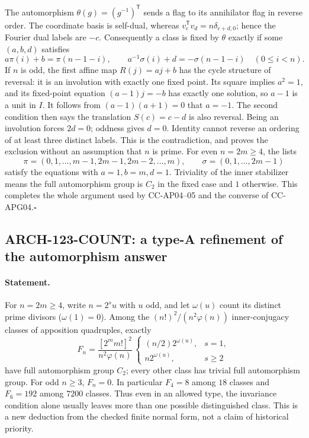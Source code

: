 The automorphism $\theta(g)=(g^{-1})^{\mathsf T}$ sends a flag to
its annihilator flag in reverse order.  The coordinate basis is
self-dual, whereas $v_c^{\mathsf T}v_d=n\delta_{c+d,0}$; hence the
Fourier dual labels are $-c$.  Consequently a class is fixed by
$\theta$ exactly if some $(a,b,d)$ satisfies
\[
 a\pi(i)+b=\pi(n-1-i),\qquad
 a^{-1}\sigma(i)+d=-\sigma(n-1-i) \quad(0\leq i<n).
\]
If $n$ is odd, the first affine map $R(j)=aj+b$ has the cycle
structure of reversal: it is an involution with exactly one fixed
point.  Its square implies $a^2=1$, and its fixed-point equation
$(a-1)j=-b$ has exactly one solution, so $a-1$ is a unit in $I$.
It follows from $(a-1)(a+1)=0$ that $a=-1$.  The second condition
then says the translation $S(c)=c-d$ is also reversal.  Being an
involution forces $2d=0$; oddness gives $d=0$.  Identity cannot
reverse an ordering of at least three distinct labels.  This is the
contradiction, and proves the exclusion without an assumption that
$n$ is prime.  For even $n=2m\geq4$, the lists
\[
 \pi=(0,1,\ldots,m-1,2m-1,2m-2,\ldots,m),\qquad
 \sigma=(0,1,\ldots,2m-1)
\]
satisfy the equations with $a=1,b=m,d=1$.  Triviality of the inner
stabilizer means the full automorphism group is $C_2$ in the fixed
case and $1$ otherwise.  This completes the whole argument used by
CC-AP04--05 and the converse of CC-APG04.\hfill$\square$

\subsection{ARCH-123-COUNT: a type-A refinement of the automorphism answer}
\paragraph{Statement.}
For $n=2m\geq4$, write $n=2^s u$ with $u$ odd, and let $\omega(u)$
count its distinct prime divisors ($\omega(1)=0$).  Among the
$(n!)^2/(n^2\varphi(n))$ inner-conjugacy classes of apposition
quadruples, exactly
\[
 F_n=\frac{[2^m m!]^2}{n^2\varphi(n)}\,
 \begin{cases}
 (n/2)2^{\omega(u)},&s=1,\\
 n2^{\omega(u)},&s\geq2
 \end{cases}
\]
have full automorphism group $C_2$; every other class has trivial
full automorphism group.  For odd $n\geq3$, $F_n=0$.
In particular $F_4=8$ among $18$ classes and $F_6=192$ among
$7200$ classes.  Thus even in an allowed type, the invariance
condition alone usually leaves more than one possible distinguished
class.  This is a new deduction from the checked finite normal form,
not a claim of historical priority.

